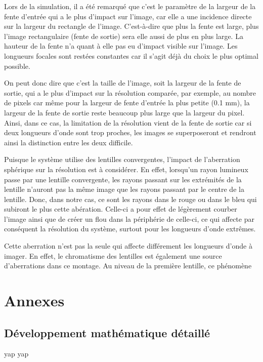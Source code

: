 \documentclass[conference]{IEEEtran}
\begin{document}
Lors de la simulation, il a été remarqué que c'est le paramètre de la largeur de la fente d'entrée qui a le plus d'impact sur l'image,
car elle a une incidence directe sur la largeur du rectangle de l'image. C'est-à-dire que plus la fente est large, plus
l'image rectangulaire (fente de sortie) sera elle aussi de plus en plus large. La hauteur de la fente n'a quant à elle pas eu d'impact
visible sur l'image. Les longueurs focales sont restées constantes car il s'agit déjà du choix le plus optimal possible.

On peut donc dire que c'est la taille de l'image, soit la largeur de la fente de sortie, qui a le plus d'impact sur la résolution comparée, par exemple, au nombre de pixels
car même pour la largeur de fente d'entrée la plus petite (0.1 mm), la largeur de la fente de sortie reste beaucoup plus large que la largeur du pixel.
Ainsi, dans ce cas, la limitation de la résolution vient de la fente de sortie car si deux longueurs d'onde sont trop proches, les images se superposeront
et rendront ainsi la distinction entre les deux difficile.

Puisque le système utilise des lentilles convergentes, l'impact de l'aberration sphérique\cite{edmund_optics_aberrations} sur la résolution est à considérer.
En effet, lorsqu'un rayon lumineux passe par une lentille convergente, les rayons passant sur les extrémités de la lentille
n'auront pas la même image que les rayons passant par le centre de la lentille. Donc, dans notre cas, ce sont les
rayons dans le rouge ou dans le bleu qui subiront le plus cette abération. Celle-ci a pour effet de légèrement courber l'image
ainsi que de créer un flou dans la périphérie de celle-ci, ce qui affecte par conséquent la résolution du système, surtout pour les longueurs d'onde
extrêmes. 

Cette aberration n'est pas la seule qui affecte différement les longueurs d'onde à imager. En effet, le chromatisme des lentilles
est également une source d'aberrations dans ce montage. Au niveau de la première lentille, ce phénomène 






\clearpage

\section{Annexes}

\subsection{Développement mathématique détaillé}
yap yap
\end{document}
